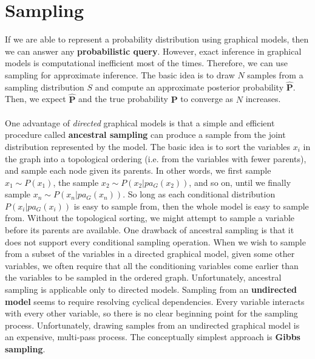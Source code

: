 \section{Sampling}
If we are able to represent a probability distribution using graphical models, then we can answer any \textbf{probabilistic query}. However, exact inference in graphical models is computational inefficient most of the times. Therefore, we can use sampling for approximate inference. The basic idea is to draw $N$ samples from a sampling distribution $S$ and compute an approximate posterior probability $\hat{\textbf{P}}$. Then, we expect $\hat{\textbf{P}}$ and the true probability $\textbf{P}$ to converge as $N$ increases.\\\\
One advantage of \textit{directed} graphical models is that a simple and efficient procedure called \textbf{ancestral sampling} can produce a sample from the joint distribution represented by the model.\newline\newline
The basic idea is to sort the variables $x_i$ in the graph into a topological ordering (i.e. from the variables with fewer parents), and sample each node given its parents. In other words, we first sample $x_1 \sim P(x_1)$, the sample $x_2 \sim P(x_2|pa_G(x_2))$, and so on, until we finally sample $x_n \sim P(x_n|pa_G(x_n))$.\newline\newline
So long as each conditional distribution $P(x_i | pa_G(x_i))$ is easy to sample from, then the whole model is easy to sample from. Without the topological sorting, we might attempt to sample a variable before its parents are available.\newline\newline
One drawback of ancestral sampling is that it does not support every conditional sampling operation. When we wish to sample from a subset of the variables in a directed graphical model, given some other variables, we often require that all the conditioning variables come earlier than the variables to be sampled in the ordered graph. Unfortunately, ancestral sampling is applicable only to directed models.\newline\newline
Sampling from an \textbf{undirected model} seems to require resolving cyclical dependencies. Every variable interacts with every other variable, so there is no clear beginning point for the sampling process. Unfortunately, drawing samples from an undirected graphical model is an expensive, multi-pass process. The conceptually simplest approach is \textbf{Gibbs sampling}.

